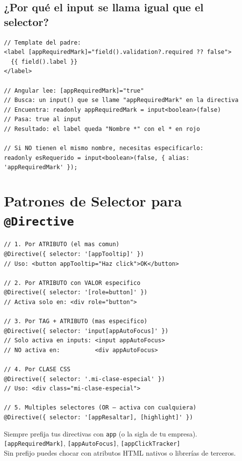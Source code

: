 \documentclass[12pt, a4paper]{article}
\begin{document}
\subsection{  ¿Por qué el input se llama igual que el selector?}

\begin{lstlisting}
// Template del padre:
<label [appRequiredMark]="field().validation?.required ?? false">
  {{ field().label }}
</label>

// Angular lee: [appRequiredMark]="true"
// Busca: un input() que se llame "appRequiredMark" en la directiva
// Encuentra: readonly appRequiredMark = input<boolean>(false)
// Pasa: true al input
// Resultado: el label queda "Nombre *" con el * en rojo

// Si NO tienen el mismo nombre, necesitas especificarlo:
readonly esRequerido = input<boolean>(false, { alias: 'appRequiredMark' });
\end{lstlisting}

\section{  Patrones de Selector para \texttt{@Directive}}

\begin{lstlisting}
// 1. Por ATRIBUTO (el mas comun)
@Directive({ selector: '[appTooltip]' })
// Uso: <button appTooltip="Haz click">OK</button>

// 2. Por ATRIBUTO con VALOR especifico
@Directive({ selector: '[role=button]' })
// Activa solo en: <div role="button">

// 3. Por TAG + ATRIBUTO (mas especifico)
@Directive({ selector: 'input[appAutoFocus]' })
// Solo activa en inputs: <input appAutoFocus>
// NO activa en:          <div appAutoFocus>

// 4. Por CLASE CSS
@Directive({ selector: '.mi-clase-especial' })
// Uso: <div class="mi-clase-especial">

// 5. Multiples selectores (OR — activa con cualquiera)
@Directive({ selector: '[appResaltar], [highlight]' })
\end{lstlisting}

\begin{tcolorbox}[regla, title={\emoji{pushpin} \emoji{ok-hand} Convención de Nombres}]
  Siempre prefija tus directivas con \texttt{app} (o la sigla de tu empresa).\\
  \texttt{[appRequiredMark]}, \texttt{[appAutoFocus]}, \texttt{[appClickTracker]}\\[0.3cm]
   Sin prefijo puedes chocar con atributos HTML nativos o librerías de terceros.
\end{tcolorbox}
\end{document}
